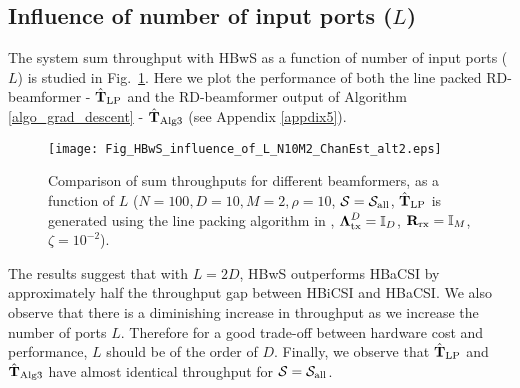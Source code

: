 \documentclass[journal,comsoc]{IEEEtran}
\begin{document}
\subsection{Influence of number of input ports ($L$)} \label{subsec_influence_of_L}
The system sum throughput with HBwS as a function of number of input ports ($L$) is studied in Fig.~\ref{fig_influence_of_L}. Here we plot the performance of both the line packed RD-beamformer - $\hat{\mathbf{T}}_{\rm LP}$ and the RD-beamformer output of Algorithm \ref{algo_grad_descent}  - $\hat{\mathbf{T}}_{\rm Alg3}$ (see Appendix \ref{appdix5}). 
%
\begin{figure}[!h]
\centering
\texttt{[image: Fig\_HBwS\_influence\_of\_L\_N10M2\_ChanEst\_alt2.eps]}
\caption{Comparison of sum throughputs for different beamformers, as a function of $L$ \big($N=100,D=10,M=2,\rho=10$, $\mathcal{S} = \mathcal{S}_{\rm all}$, $\hat{\mathbf{T}}_{\rm LP}$ is generated using the line packing algorithm in \cite{MedraRepository}, $\boldsymbol{\Lambda}^{D}_{\rm tx} = \mathbb{I}_D$, $\mathbf{R}_{\rm rx} = \mathbb{I}_M$, $\zeta = 10^{-2}$\big).}
\label{fig_influence_of_L}
\end{figure}
%
The results suggest that with $L = 2D$, HBwS outperforms HBaCSI by approximately half the throughput gap between HBiCSI and HBaCSI. We also observe that there is a diminishing increase in throughput as we increase the number of ports $L$. Therefore for a good trade-off between hardware cost and performance, $L$ should be of the order of $D$. Finally, we observe that $\hat{\mathbf{T}}_{\rm LP}$ and $\hat{\mathbf{T}}_{\rm Alg3}$ have almost identical throughput for $\mathcal{S} = \mathcal{S}_{\rm all}$. 
\end{document}
